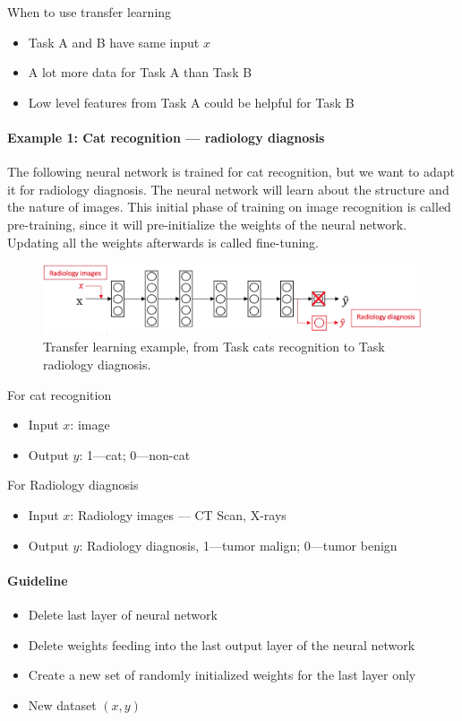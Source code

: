 \documentclass[UTF8]{article}
\begin{document}
When to use transfer learning
\begin{itemize}
    \item Task A and B have same input $x$
    \item A lot more data for Task A than Task B
    \item Low level features from Task A could be helpful for Task B
\end{itemize}

\paragraph{Example 1: Cat recognition --- radiology diagnosis}
The following neural network is trained for cat recognition, but we want to adapt it for radiology
diagnosis. The neural network will learn about the structure and the nature of images. This initial
phase of training on image recognition is called pre-training, since it will pre-initialize the
weights of the neural network. Updating all the weights afterwards is called fine-tuning.

\begin{figure}[htb]
    \centering
    \includegraphics[width=45em]{figures/transfer-learning}
    \caption{Transfer learning example, from Task cats recognition to Task radiology diagnosis.}
    \label{fig:transfer-learning}
\end{figure}

For cat recognition
\begin{itemize}
    \item Input $x$: image
    \item Output $y$: 1---cat; 0---non-cat
\end{itemize}

For Radiology diagnosis
\begin{itemize}
    \item Input $x$: Radiology images --- CT Scan, X-rays
    \item Output $y$: Radiology diagnosis, 1---tumor malign; 0---tumor benign
\end{itemize}

\paragraph{Guideline}
\begin{itemize}
    \item Delete last layer of neural network
    \item Delete weights feeding into the last output layer of the neural network
    \item Create a new set of randomly initialized weights for the last layer only
    \item New dataset $(x, y)$
\end{itemize}
\end{document}
